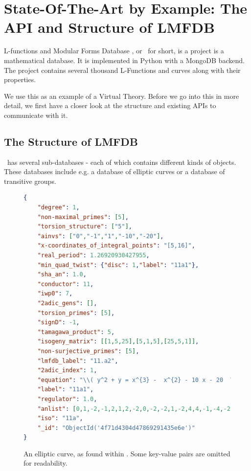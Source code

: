 \section{State-Of-The-Art by Example: The API and Structure of LMFDB}\label{sec:sota}

L-functions and Modular Forms Database \cite{lmfdb}, or \lmfdb\ for short, is a project is a mathematical database. 
It is implemented in Python with a MongoDB backend. 
The project contains several thousand L-Functions and curves along with their properties. 

We use this as an example of a Virtual Theory. 
Before we go into this in more detail, we first have a closer look at the structure and existing APIs to communicate with it. 

\subsection{The Structure of LMFDB}\label{sec:sota:struct}

\lmfdb\ has several sub-databases - each of which contains different kinds of objects. 
These databases include e.g. a database of elliptic curves or a database of transitive groups. 

\begin{figure}[h]
  \begin{center}
      \begin{lstlisting}[language=json]
{
    "degree": 1,
    "non-maximal_primes": [5],
    "torsion_structure": ["5"],
    "ainvs": ["0","-1","1","-10","-20"],
    "x-coordinates_of_integral_points": "[5,16]",
    "real_period": 1.26920930427955,
    "min_quad_twist": {"disc": 1,"label": "11a1"},
    "sha_an": 1.0,
    "conductor": 11,
    "iwp0": 7,
    "2adic_gens": [],
    "torsion_primes": [5],
    "signD": -1,
    "tamagawa_product": 5,
    "isogeny_matrix": [[1,5,25],[5,1,5],[25,5,1]],
    "non-surjective_primes": [5],
    "lmfdb_label": "11.a2",
    "2adic_index": 1,
    "equation": "\\( y^2 + y = x^{3} -  x^{2} - 10 x - 20  \\)",
    "label": "11a1",
    "regulator": 1.0,
    "anlist": [0,1,-2,-1,2,1,2,-2,0,-2,-2,1,-2,4,4,-1,-4,-2,4,0,2],
    "iso": "11a",
    "_id": "ObjectId('4f71d4304d47869291435e6e')"
}
      \end{lstlisting}
  \end{center}
  
  \vspace*{-1.5em}
  

  \caption[An elliptic curve within lmfdb]{
    An elliptic curve, as found within \lmfdb. 
    Some key-value pairs are omitted for readability. 
  }
  \label{fig:lmfdbexample}
\end{figure}

